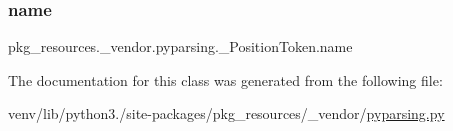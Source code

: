\subsubsection{\texorpdfstring{name}{name}}
{\footnotesize\ttfamily pkg\+\_\+resources.\+\_\+vendor.\+pyparsing.\+\_\+\+Position\+Token.\+name}



The documentation for this class was generated from the following file\+:\begin{DoxyCompactItemize}
\item 
venv/lib/python3./site-\/packages/pkg\+\_\+resources/\+\_\+vendor/\hyperlink{pkg__resources_2__vendor_2pyparsing_8py}{pyparsing.\+py}\end{DoxyCompactItemize}

